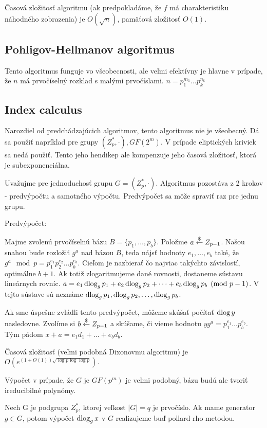 Časová zložitosť algoritmu (ak predpokladáme,
že $f$ má charakteristiku náhodného zobrazenia) je
$O(\sqrt{n})$, pamäťová zložitosť $O(1)$.

\subsection{Pohligov-Hellmanov algoritmus}
Tento algoritmus funguje vo všeobecnosti, ale veľmi efektívny je hlavne v
prípade, že $n$ má prvočíselný rozklad s malými prvočíslami.
$n=p_1^{m_1} \dots p_k^{n_k}$



\subsection{Index calculus}
Narozdiel od predchádzajúcich algoritmov, tento algoritmus nie je
všeobecný. Dá sa použiť napríklad pre grupy $(Z_p^*,\cdot), GF(2^m)$.
V prípade eliptických kriviek sa nedá použiť. Tento jeho hendikep
ale kompenzuje jeho časová zložitosť, ktorá je subexponenciálna.

Uvažujme pre jednoduchosť grupu $G=(Z_p^*,\cdot)$.
Algoritmus pozostáva z 2 krokov - predvýpočtu a samotného výpočtu.
Predvýpočet sa môže spraviť raz pre jednu grupu.

Predvýpočet:

Majme zvolenú prvočíselnú bázu $B=\{p_1,\dots,p_b\}$.
Položme $a \overset{\$}{\leftarrow} Z_{p-1}$. 
Našou snahou bude rozložiť $g^a$ nad bázou $B$, teda nájsť hodnoty
$e_1,\dots,e_b$ také, že $g^a \mod p = p_1^{e_1} p_2^{e_2} \dots
p_b^{e_b}$.
Cieľom je nazbierať čo najviac takýchto závislostí, optimálne
$b+1$. Ak totiž zlogaritmujeme dané rovnosti, dostaneme sústavu
lineárnych rovníc.
$a=e_1 \operatorname{dlog}_g p_1 + e_2 \operatorname{dlog}_g p_2 + \dots + e_b \operatorname{dlog}_g p_b \pmod{p-1}$.
V tejto sústave sú neznáme $\operatorname{dlog}_g p_1, \operatorname{dlog}_g p_2, \dots, \operatorname{dlog}_g p_b$.

Ak sme úspešne zvládli tento predvýpočet, môžeme skúšať počítať $\operatorname{dlog} y$
nasledovne.
Zvolíme si $b\overset{\$}{\leftarrow} Z_{p-1}$ a skúšame, či vieme hodnotu
$y g^a = p_1 ^ {e_1} \dots p_b ^ {e_b}$. Tým pádom
$x+a = e_1 d_1 + \dots + e_b d_b$.

Časová zložitosť (veľmi podobná Dixonovmu algoritmu) je
$O(e^{(1+O(1))\sqrt{\log p \log \log p}})$.

\begin{poznamka}
    Výpočet v prípade, že $G$ je $GF(p^m)$ je veľmi podobný, bázu budú ale
    tvoriť ireducibilné polynómy.
\end{poznamka}
\begin{poznamka}
    Nech G je podgrupa $Z_p^*$, ktorej veľkost $|G|=q$ je prvočíslo.
    Ak mame generator $g\in G$, potom výpočet $\operatorname{dlog}_g x$ v $G$ 
    realizujeme buď pollard rho metodou.
\end{poznamka}
